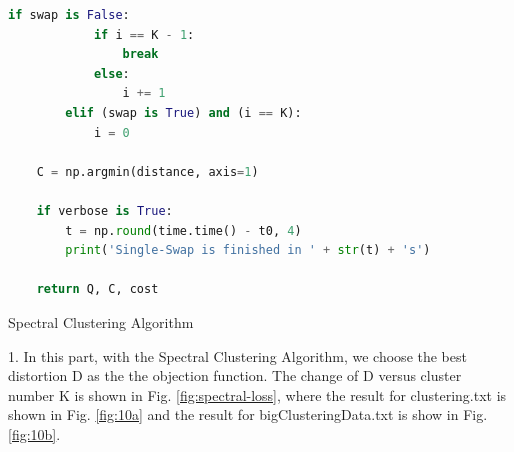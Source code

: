 \begin{description}
\begin{description}
\begin{lstlisting}[language=Python, caption=Single-Swap Algorithm Python Code]
        if swap is False:
            if i == K - 1:
                break
            else:
                i += 1
        elif (swap is True) and (i == K):
            i = 0

    C = np.argmin(distance, axis=1)

    if verbose is True:
        t = np.round(time.time() - t0, 4)
        print('Single-Swap is finished in ' + str(t) + 's')

    return Q, C, cost
\end{lstlisting}

\end{description}

\newpage
\item[\Romannum{4}.] Spectral Clustering Algorithm

\begin{description}
\item{1.} In this part, with the Spectral Clustering Algorithm, we choose the best distortion D as the the objection function. The change of D versus cluster number K is shown in Fig. \ref{fig:spectral-loss}, where the result for clustering.txt is shown in Fig. \ref{fig:10a} and the result for bigClusteringData.txt is show in Fig. \ref{fig:10b}.


\end{description}
\end{description}
